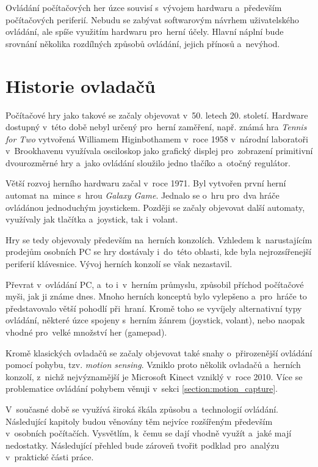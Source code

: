 \documentclass[thesis=B,czech,hidelinks]{FITthesis}[2012/06/26] %
\begin{document}
Ovládání počítačových her úzce souvisí s~vývojem hardwaru a~především počítačových periferií. Nebudu se zabývat softwarovým návrhem uživatelského ovládání, ale spíše využitím hardwaru pro~herní účely. Hlavní náplní bude srovnání několika rozdílných způsobů ovládání, jejich přínosů a~nevýhod.

\section{Historie ovladačů}

Počítačové hry jako takové se začaly objevovat v~50. letech 20. století. Hardware dostupný v~této době nebyl určený pro~herní zaměření, např. známá hra \textit{Tennis for Two} vytvořená Williamem Higinbothamem v~roce 1958 v~národní laboratoři v~Brookhavenu využívala osciloskop jako grafický displej pro~zobrazení primitivní dvourozměrné hry a~jako ovládání sloužilo jedno tlačíko a~otočný regulátor.\cite{gamevshardware}

Větší rozvoj herního hardwaru začal v~roce 1971. Byl vytvořen první herní automat na~mince s~hrou \textit{Galaxy Game}. Jednalo se o~hru pro~dva hráče ovládánou jednoduchým joystickem. Později se začaly objevovat další automaty, využívaly jak tlačítka a~joystick, tak i~volant.

Hry se tedy objevovaly především na~herních konzolích. Vzhledem k~narustajícím prodejům osobních PC se hry dostávaly i~do~této oblasti, kde byla nejrozsířenejší periferií klávesnice. Vývoj herních konzolí se však nezastavil.

Převrat v~ovládání PC, a~to i~v~herním průmyslu, způsobil příchod počítačové myši, jak ji známe dnes. Mnoho herních konceptů bylo vylepšeno a~pro~hráče to představovalo větší pohodlí při~hraní. \cite{gamevshardware} Kromě toho se vyvíjely alternativní typy ovládání, některé úzce spojeny s~herním žánrem (joystick, volant), nebo naopak vhodné pro~velké množství her (gamepad).

Kromě klasických ovladačů se začaly objevovat také snahy o~přirozenější ovládání pomocí pohybu, tzv. \textit{motion sensing}. Vzniklo proto několik ovladačů a~herních konzolí, z~nichž nejvýznamější je Microsoft Kinect vzniklý v~roce 2010.\cite{wikicontrollers} Více se problematice ovládání pohybem věnuji v~sekci \ref{section:motion_capture}.

V~současné době se využívá široká škála způsobu a~technologií ovládání. Následující kapitoly budou věnovány těm nejvíce rozšířeným především v~osobních počítačích. Vysvětlím, k~čemu se dají vhodně využít a~jaké mají nedostatky. Následující přehled bude zároveň tvořit podklad pro~analýzu v~praktické části práce.
\end{document}
